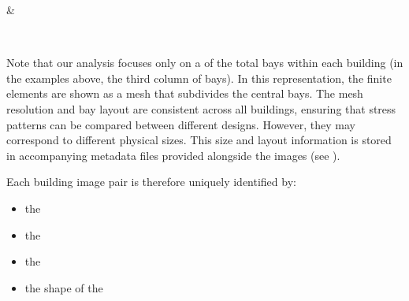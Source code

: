 \documentclass[letterpaper,10pt,english]{sphinxmanual}
\begin{document}
\begin{savenotes}\sphinxattablestart
\sphinxthistablewithglobalstyle
\centering
\begin{tabular}[t]{}
\sphinxtoprule
\sphinxtableatstartofbodyhook

\begin{sphinxfigure-in-table}
\centering
\capstart
\noindent{}
\label{\detokenize{data:id2}}\end{sphinxfigure-in-table}\relax
&

\begin{sphinxfigure-in-table}
\centering
\capstart
\noindent{}
\label{\detokenize{data:id3}}\end{sphinxfigure-in-table}\relax
\\
\sphinxbottomrule
\end{tabular}
\sphinxtableafterendhook\par
\sphinxattableend\end{savenotes}

\sphinxAtStartPar
Note that our analysis focuses only on a  of the total bays within each
building (in the examples above, the third column of bays).
In this representation, the finite elements are shown as a mesh that subdivides
the central bays.
The mesh resolution and bay layout are consistent across all buildings,
ensuring that stress patterns can be compared between different designs.
However, they may correspond to different physical sizes.
This size and layout information is stored in accompanying metadata files
provided alongside the images (see {\hyperref[\detokenize{data:metadata}]{}}).

\sphinxAtStartPar
Each building image pair is therefore uniquely identified by:
\begin{itemize}
\item {} 
\sphinxAtStartPar
the 

\item {} 
\sphinxAtStartPar
the 

\item {} 
\sphinxAtStartPar
the 

\item {} 
\sphinxAtStartPar
the shape of the 

\end{itemize}
\end{document}

